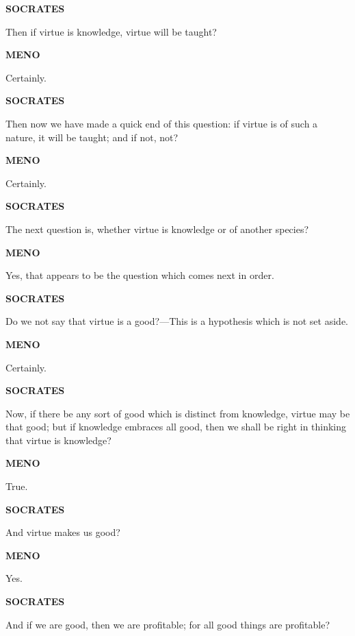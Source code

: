 \documentclass[11pt,letter]{article}
\begin{document}
\par \textbf{SOCRATES}
\par   Then if virtue is knowledge, virtue will be taught?

\par \textbf{MENO}
\par   Certainly.

\par \textbf{SOCRATES}
\par   Then now we have made a quick end of this question:  if virtue is of such a nature, it will be taught; and if not, not?

\par \textbf{MENO}
\par   Certainly.

\par \textbf{SOCRATES}
\par   The next question is, whether virtue is knowledge or of another species?

\par \textbf{MENO}
\par   Yes, that appears to be the question which comes next in order.

\par \textbf{SOCRATES}
\par   Do we not say that virtue is a good?—This is a hypothesis which is not set aside.

\par \textbf{MENO}
\par   Certainly.

\par \textbf{SOCRATES}
\par   Now, if there be any sort of good which is distinct from knowledge, virtue may be that good; but if knowledge embraces all good, then we shall be right in thinking that virtue is knowledge?

\par \textbf{MENO}
\par   True.

\par \textbf{SOCRATES}
\par   And virtue makes us good?

\par \textbf{MENO}
\par   Yes.

\par \textbf{SOCRATES}
\par   And if we are good, then we are profitable; for all good things are profitable?
\end{document}
